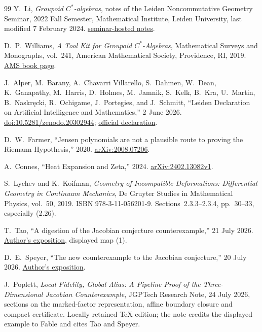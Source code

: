 \begin{thebibliography}{99}
Y.~Li,
\emph{Groupoid $C^*$-algebras},
notes of the Leiden Noncommutative Geometry Seminar, 2022 Fall Semester,
Mathematical Institute, Leiden University, last modified 7 February 2024.
\href{https://ncg-leiden.github.io/groupoid2022/groupoid_notes.pdf}
{seminar-hosted notes}.

D.~P.~Williams,
\emph{A Tool Kit for Groupoid $C^*$-Algebras},
Mathematical Surveys and Monographs, vol.~241,
American Mathematical Society, Providence, RI, 2019.
\href{https://bookstore.ams.org/surv-241/}{AMS book page}.

J.~Alper, M.~Barany, A.~Chavarri Villarello, S.~Dahmen, W.~Dean,
K.~Ganapathy, M.~Harris, D.~Holmes, M.~Jamnik, S.~Kelk, B.~Kra,
U.~Martin, B.~Naskr\k{e}cki, R.~Ochigame, J.~Portegies, and J.~Schmitt,
``Leiden Declaration on Artificial Intelligence and Mathematics,''
2 June 2026.
\href{https://doi.org/10.5281/zenodo.20302944}{doi:10.5281/zenodo.20302944};
\href{https://leidendeclaration.ai/}{official declaration}.

D.~W.~Farmer,
``Jensen polynomials are not a plausible route to proving the Riemann Hypothesis,''
2020. \href{https://arxiv.org/abs/2008.07206}{arXiv:2008.07206}.

A.~Connes,
``Heat Expansion and Zeta,''
2024. \href{https://arxiv.org/abs/2402.13082v1}{arXiv:2402.13082v1}.

S.~Lychev and K.~Koifman, \emph{Geometry of Incompatible Deformations:
Differential Geometry in Continuum Mechanics}, De Gruyter Studies in
Mathematical Physics, vol.~50, 2019. ISBN 978-3-11-056201-9.
Sections~2.3.3--2.3.4, pp.~30--33, especially (2.26).

T.~Tao, ``A digestion of the Jacobian conjecture counterexample,''
21 July 2026.
\href{https://terrytao.wordpress.com/2026/07/21/a-digestion-of-the-jacobian-conjecture-counterexample/}{Author's exposition}, displayed map (1).

D.~E.~Speyer, ``The new counterexample to the Jacobian conjecture,''
20 July 2026.
\href{https://sbseminar.wordpress.com/2026/07/20/the-new-counterexample-to-the-jacobian-conjecture/}{Author's exposition}.

J.~Poplett, \emph{Local Fidelity, Global Alias: A Pipeline Proof of the
Three-Dimensional Jacobian Counterexample}, JGPTech Research Note,
24 July 2026, sections on the marked-factor representation, affine
boundary closure and compact certificate. Locally retained TeX edition;
the note credits the displayed example to Fable and cites Tao and Speyer.


\end{thebibliography}
